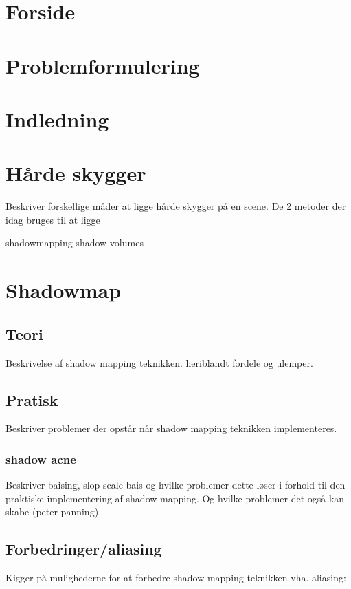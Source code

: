 \documentclass[11pt,a4paper]{article}
\begin{document}
\section{Forside}

\section{Problemformulering}

\section{Indledning}


\section{Hårde skygger}
Beskriver forskellige måder at ligge hårde skygger på en scene. De 2 metoder der idag bruges til at ligge 

shadowmapping
 shadow volumes

\section{Shadowmap}

\subsection{Teori}
Beskrivelse af shadow mapping teknikken. heriblandt fordele og ulemper.

\subsection{Pratisk}
Beskriver problemer der opstår når shadow mapping teknikken implementeres.
 
\subsubsection{shadow acne}
Beskriver  baising, slop-scale bais og hvilke problemer dette løser i forhold til den praktiske implementering af shadow mapping. Og hvilke problemer det også kan skabe (peter panning)


\subsection{Forbedringer/aliasing}
Kigger på mulighederne for at forbedre shadow mapping teknikken vha. aliasing:
\end{document}
